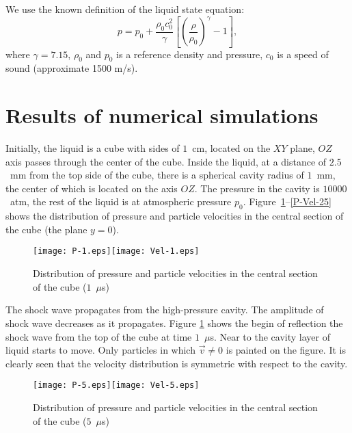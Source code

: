 \documentclass[a4paper]{jpconf}
\begin{document}
We use the known definition of the liquid state equation:  
\[p= p_0 + \frac{\rho_0 c_0^2}{\gamma} \left[ \left( \frac{\rho}{\rho_0} \right)^{\gamma} - 1 \right],\]
where  $\gamma = 7.15$, $\rho_0$ and $p_0$ is a reference density and pressure, $c_0$ is a speed of sound (approximate 1500 m/s).

			
\section{Results of numerical simulations}


Initially, the liquid is a cube with sides of $1$~cm, located on the $XY$ plane, $OZ$ axis passes through the center of the cube. Inside the liquid, at a distance of $2.5$~mm from the top side of the cube, there is a spherical cavity radius of $1$~mm, the center of which is located on the axis $OZ$. The pressure in the cavity is $10000$~atm, the rest of the liquid is at atmospheric pressure $p_0$. 
Figure~\ref{P-Vel-1}--\ref{P-Vel-25} shows the distribution of pressure and particle velocities in the central section of the cube (the plane $y=0$).

\begin{figure}
\begin{center}
\texttt{[image: P-1.eps]}\texttt{[image: Vel-1.eps]}
\end{center}
\caption{\label{P-Vel-1} Distribution of pressure and particle velocities in the central section of the cube ($1$~$\mu$s)}
\end{figure}


The shock wave propagates from the high-pressure cavity. The amplitude of shock wave decreases as it propagates. 
Figure \ref{P-Vel-1} shows the begin of reflection the shock wave from the top of the cube at time $1$~$\mu$s. Near to the cavity layer of liquid starts to move. Only particles in which $\vec{v} \neq 0$ is painted on the figure. It is clearly seen that the velocity distribution is symmetric with respect to the cavity.
 
\begin{figure}
\begin{center}
\texttt{[image: P-5.eps]}\texttt{[image: Vel-5.eps]}
\end{center}
\caption{\label{P-Vel-5} Distribution of pressure and particle velocities in the central section of the cube ($5$~$\mu$s)}
\end{figure}
\end{document}
